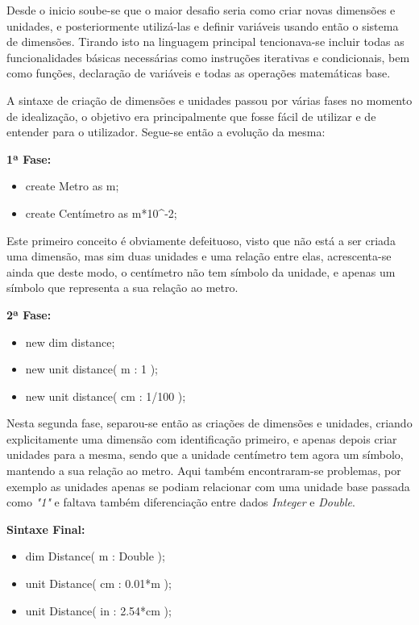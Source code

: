 \documentclass[10pt,portuguese]{article}
\begin{document}
\par Desde o inicio soube-se que o maior desafio seria como criar novas dimensões e unidades, e posteriormente utilizá-las e definir variáveis usando então o sistema de dimensões. Tirando isto na linguagem principal tencionava-se incluir todas as funcionalidades básicas necessárias como instruções iterativas e condicionais, bem como funções, declaração de variáveis e todas as operações matemáticas base.
\par A sintaxe de criação de dimensões e unidades passou por várias fases no momento de idealização, o objetivo era principalmente que fosse fácil de utilizar e de entender para o utilizador. Segue-se então a evolução da mesma:
\newline
\par \textbf{1ª Fase:}
\begin{itemize}
    \item create Metro as m;
    \item create Centímetro as m*10\string^-2;
\end{itemize}
\par Este primeiro conceito é obviamente defeituoso, visto que não está a ser criada uma dimensão, mas sim duas unidades e uma relação entre elas, acrescenta-se ainda que deste modo, o centímetro não tem símbolo da unidade, e apenas um símbolo que representa a sua relação ao metro.
\newline
\par \textbf{2ª Fase:}
\begin{itemize}
    \item new dim distance;
    \item new unit distance( m : 1 );
    \item new unit distance( cm : 1/100 );
\end{itemize}
\par Nesta segunda fase, separou-se então as criações de dimensões e unidades, criando explicitamente uma dimensão com identificação primeiro, e apenas depois criar unidades para a mesma, sendo que a unidade centímetro tem agora um símbolo, mantendo a sua relação ao metro. Aqui também encontraram-se problemas, por exemplo as unidades apenas se podiam relacionar com uma unidade base passada como \emph{"1"} e faltava também diferenciação entre dados \emph{Integer} e \emph{Double}.
\newline
\par \textbf{Sintaxe Final:}
\begin{itemize}
    \item dim Distance( m : Double );
    \item unit Distance( cm : 0.01*m );
    \item unit Distance( in : 2.54*cm );
\end{itemize}
\end{document}
